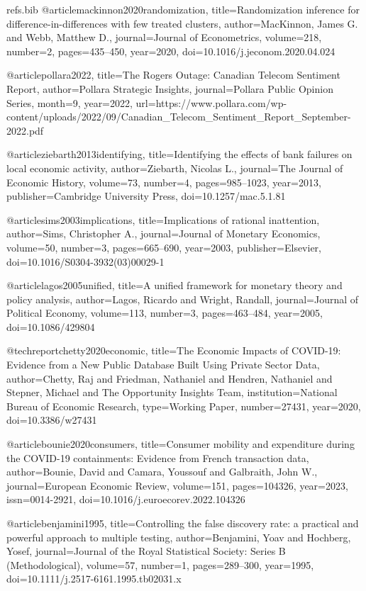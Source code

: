 \begin{filecontents}[overwrite]{refs.bib}
@article{mackinnon2020randomization,
  title={Randomization inference for difference-in-differences with few treated clusters},
  author={MacKinnon, James G. and Webb, Matthew D.},
  journal={Journal of Econometrics},
  volume={218},
  number={2},
  pages={435--450},
  year={2020},
  doi={10.1016/j.jeconom.2020.04.024}
}

@article{pollara2022,
  title={The Rogers Outage: Canadian Telecom Sentiment Report},
  author={{Pollara Strategic Insights}},
  journal={Pollara Public Opinion Series},
  month={9},
  year={2022},
  url={https://www.pollara.com/wp-content/uploads/2022/09/Canadian_Telecom_Sentiment_Report_September-2022.pdf}
}

@article{ziebarth2013identifying,
  title={Identifying the effects of bank failures on local economic activity},
  author={Ziebarth, Nicolas L.},
  journal={The Journal of Economic History},
  volume={73},
  number={4},
  pages={985--1023},
  year={2013},
  publisher={Cambridge University Press},
  doi={10.1257/mac.5.1.81}
}

@article{sims2003implications,
  title={Implications of rational inattention},
  author={Sims, Christopher A.},
  journal={Journal of Monetary Economics},
  volume={50},
  number={3},
  pages={665--690},
  year={2003},
  publisher={Elsevier},
  doi={10.1016/S0304-3932(03)00029-1}
}

@article{lagos2005unified,
  title={A unified framework for monetary theory and policy analysis},
  author={Lagos, Ricardo and Wright, Randall},
  journal={Journal of Political Economy},
  volume={113},
  number={3},
  pages={463--484},
  year={2005},
  doi={10.1086/429804}
}

@techreport{chetty2020economic,
  title={The Economic Impacts of COVID-19: Evidence from a New Public Database Built Using Private Sector Data},
  author={Chetty, Raj and Friedman, Nathaniel and Hendren, Nathaniel and Stepner, Michael and {The Opportunity Insights Team}},
  institution={National Bureau of Economic Research},
  type={Working Paper},
  number={27431},
  year={2020},
  doi={10.3386/w27431}
}

@article{bounie2020consumers,
  title={Consumer mobility and expenditure during the COVID-19 containments: Evidence from French transaction data},
  author={Bounie, David and Camara, Youssouf and Galbraith, John W.},
  journal={European Economic Review},
  volume={151},
  pages={104326},
  year={2023},
  issn={0014-2921},
  doi={10.1016/j.euroecorev.2022.104326}
}

@article{benjamini1995,
  title={Controlling the false discovery rate: a practical and powerful approach to multiple testing},
  author={Benjamini, Yoav and Hochberg, Yosef},
  journal={Journal of the Royal Statistical Society: Series B (Methodological)},
  volume={57},
  number={1},
  pages={289--300},
  year={1995},
  doi={10.1111/j.2517-6161.1995.tb02031.x}
}


\end{filecontents}

